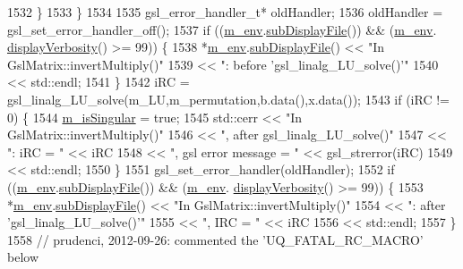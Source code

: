 \begin{DoxyCode}
{{1532     \}
1533   \}
1534 
1535   gsl\_error\_handler\_t* oldHandler;
1536   oldHandler = gsl\_set\_error\_handler\_off();
1537   \textcolor{keywordflow}{if} ((\hyperlink{class_q_u_e_s_o_1_1_matrix_a247fb0fc0b87fecdee054bb4660b68e8}{m\_env}.\hyperlink{class_q_u_e_s_o_1_1_base_environment_a8a0064746ae8dddfece4229b9ad374d6}{subDisplayFile}()) && (\hyperlink{class_q_u_e_s_o_1_1_matrix_a247fb0fc0b87fecdee054bb4660b68e8}{m\_env}.
      \hyperlink{class_q_u_e_s_o_1_1_base_environment_a1fe5f244fc0316a0ab3e37463f108b96}{displayVerbosity}() >= 99)) \{
1538     *\hyperlink{class_q_u_e_s_o_1_1_matrix_a247fb0fc0b87fecdee054bb4660b68e8}{m\_env}.\hyperlink{class_q_u_e_s_o_1_1_base_environment_a8a0064746ae8dddfece4229b9ad374d6}{subDisplayFile}() << \textcolor{stringliteral}{"In GslMatrix::invertMultiply()"}
1539                             << \textcolor{stringliteral}{": before 'gsl\_linalg\_LU\_solve()'"}
1540                             << std::endl;
1541   \}
1542   iRC = gsl\_linalg\_LU\_solve(m\_LU,m\_permutation,b.data(),x.data()); 
1543   \textcolor{keywordflow}{if} (iRC != 0) \{
1544     \hyperlink{class_q_u_e_s_o_1_1_gsl_matrix_aa83274d327bb4e668bdeec51e2466c4e}{m\_isSingular} = \textcolor{keyword}{true};
1545     std::cerr << \textcolor{stringliteral}{"In GslMatrix::invertMultiply()"}
1546               << \textcolor{stringliteral}{", after gsl\_linalg\_LU\_solve()"}
1547               << \textcolor{stringliteral}{": iRC = "} << iRC
1548               << \textcolor{stringliteral}{", gsl error message = "} << gsl\_strerror(iRC)
1549               << std::endl;
1550   \} 
1551   gsl\_set\_error\_handler(oldHandler);
1552   \textcolor{keywordflow}{if} ((\hyperlink{class_q_u_e_s_o_1_1_matrix_a247fb0fc0b87fecdee054bb4660b68e8}{m\_env}.\hyperlink{class_q_u_e_s_o_1_1_base_environment_a8a0064746ae8dddfece4229b9ad374d6}{subDisplayFile}()) && (\hyperlink{class_q_u_e_s_o_1_1_matrix_a247fb0fc0b87fecdee054bb4660b68e8}{m\_env}.
      \hyperlink{class_q_u_e_s_o_1_1_base_environment_a1fe5f244fc0316a0ab3e37463f108b96}{displayVerbosity}() >= 99)) \{
1553     *\hyperlink{class_q_u_e_s_o_1_1_matrix_a247fb0fc0b87fecdee054bb4660b68e8}{m\_env}.\hyperlink{class_q_u_e_s_o_1_1_base_environment_a8a0064746ae8dddfece4229b9ad374d6}{subDisplayFile}() << \textcolor{stringliteral}{"In GslMatrix::invertMultiply()"}
1554                             << \textcolor{stringliteral}{": after 'gsl\_linalg\_LU\_solve()'"}
1555                             << \textcolor{stringliteral}{", IRC = "} << iRC
1556                             << std::endl;
1557   \}
1558   \textcolor{comment}{// prudenci, 2012-09-26: commented the 'UQ\_FATAL\_RC\_MACRO' below}
}}
\end{DoxyCode}
